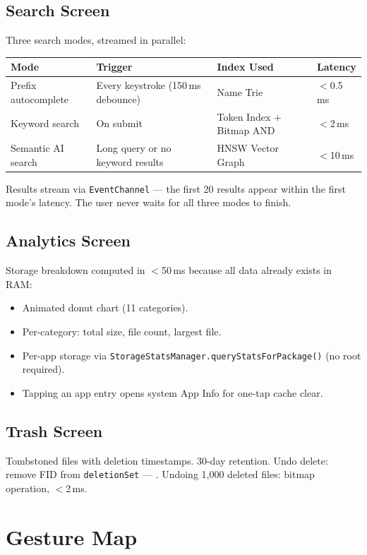 \subsection{Search Screen}

Three search modes, streamed in parallel:

\begin{longtable}{@{}p{30mm}p{30mm}p{38mm}p{38mm}@{}}
\toprule
\textbf{Mode} & \textbf{Trigger} & \textbf{Index Used} & \textbf{Latency} \\
\midrule
Prefix autocomplete & Every keystroke (150\,ms debounce) & Name Trie & $<$0.5\,ms \\
Keyword search & On submit & Token Index + Bitmap AND & $<$2\,ms \\
Semantic AI search & Long query or no keyword results & HNSW Vector Graph & $<$10\,ms \\
\bottomrule
\end{longtable}

Results stream via \texttt{EventChannel} --- the first 20 results appear within the first mode's latency. The user never waits for all three modes to finish.

\subsection{Analytics Screen}

Storage breakdown computed in $<$50\,ms because all data already exists in RAM:
\begin{itemize}
  \item Animated donut chart (11 categories).
  \item Per-category: total size, file count, largest file.
  \item Per-app storage via \texttt{StorageStatsManager.queryStatsForPackage()} (no root required).
  \item Tapping an app entry opens system App Info for one-tap cache clear.
\end{itemize}

\subsection{Trash Screen}

Tombstoned files with deletion timestamps. 30-day retention. Undo delete: remove FID from \texttt{deletionSet} --- . Undoing 1,000 deleted files:  bitmap operation, $<$2\,ms.

\section{Gesture Map}

